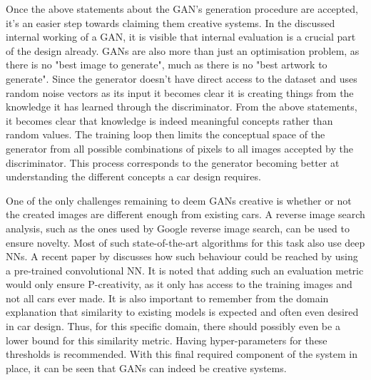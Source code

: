 Once the above statements about the GAN's generation procedure are accepted, it's an easier step towards claiming them creative systems.
In the discussed internal working of a GAN, it is visible that internal evaluation is a crucial part of the design already.
GANs are also more than just an optimisation problem, as there is no "best image to generate", much as there is no "best artwork to generate".
Since the generator doesn't have direct access to the dataset and uses random noise vectors as its input it becomes clear it is creating things from the knowledge it has learned through the discriminator.
From the above statements, it becomes clear that knowledge is indeed meaningful concepts rather than random values.
The training loop then limits the conceptual space of the generator from all possible combinations of pixels to all images accepted by the discriminator.
This process corresponds to the generator becoming better at understanding the different concepts a car design requires.

One of the only challenges remaining to deem GANs creative is whether or not the created images are different enough from existing cars.
A reverse image search analysis, such as the ones used by Google reverse image search, can be used to ensure novelty.
Most of such state-of-the-art algorithms for this task also use deep NNs.
A recent paper by \citet{reverseimagesearch} discusses how such behaviour could be reached by using a pre-trained convolutional NN.
It is noted that adding such an evaluation metric would only ensure P-creativity, as it only has access to the training images and not all cars ever made.
It is also important to remember from the domain explanation that similarity to existing models is expected and often even desired in car design.
Thus, for this specific domain, there should possibly even be a lower bound for this similarity metric.
Having hyper-parameters for these thresholds is recommended.
With this final required component of the system in place, it can be seen that GANs can indeed be creative systems.